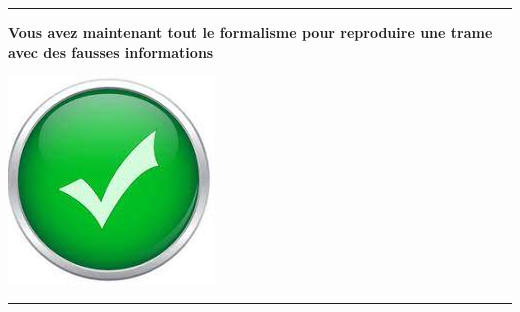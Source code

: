 \documentclass[french, 12pt]{article}%
\newif\ifPROF
\begin{document}
\ifPROF
\color{red}
\footnotesize
\begin{lstlisting}[style=commande]

Frame 127: 92 bytes on wire (736 bits), 92 bytes captured (736 bits) on interface \Device\NPF_{C961D6CB-060E-4263-A69C-163F2B2E6FBE}, id 0
Ethernet II, Src: Espressif_fc:b1:dc (c8:c9:a3:fc:b1:dc), Dst: HonHaiPrecis_6f:8f:df (4c:0f:6e:6f:8f:df)
Internet Protocol Version 4, Src: 192.168.1.71, Dst: 192.168.1.19
Transmission Control Protocol, Src Port: 49585, Dst Port: 80, Seq: 200, Ack: 1, Len: 38
[2 Reassembled TCP Segments (237 bytes): #125(199), #127(38)]
Hypertext Transfer Protocol
JavaScript Object Notation: application/json
    Object
        Member: id
            [Path with value: /id:ESP32-001]
            [Member with value: id:ESP32-001]
            String value: ESP32-001
            Key: id
            [Path: /id]
        Member: temperature
            [Path with value: /temperature:53.33]
            [Member with value: temperature:53.33]
            Number value: 53.33
            Key: temperature
            [Path: /temperature]
\end{lstlisting}
\normalsize
\normalcolor
\else

\fi




\vspace{0.5cm}
\begin{center}
 \rule{0.75\linewidth}{1pt}
\end{center}
\begin{minipage}[c]{0.59\linewidth}

\textbf{Vous avez maintenant tout le formalisme pour reproduire une trame avec des fausses informations}
\end{minipage}
\begin{minipage}[c]{0.4\linewidth}
\begin{center}
\includegraphics[scale=0.1]{./ressource/OKLogo}
\end{center}
\end{minipage}
\begin{center}
 \rule{0.75\linewidth}{1pt}
\end{center}
\end{document}
